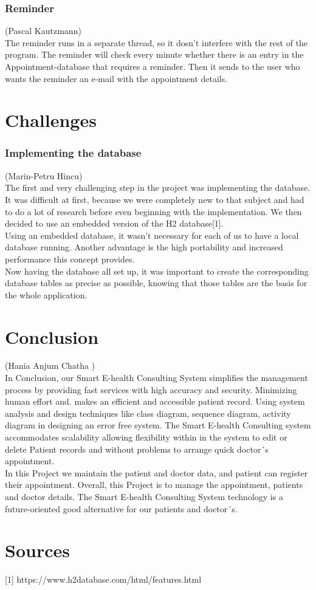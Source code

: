 \documentclass[a4paper, 12pt]{report}
\begin{document}
\subsection{Reminder}
{\tiny (Pascal Kautzmann)\\}
The reminder runs in a separate thread, so it dosn't interfere with the rest of the program.
The reminder will check every minute whether there is an entry in the Appointment-database that requires a reminder. 
Then it sends to the user who wants the reminder an e-mail with the appointment details.


\chapter{Challenges}
\subsection{Implementing the database}
{\tiny (Marin-Petru Hincu)\\}
The first and very challenging step in the project was implementing the database. It was difficult at first, because we were completely new to that subject and had to do a lot of research before even beginning with the implementation. We then decided to use an embedded version of the H2 database[1].\\
Using an embedded database, it wasn't necessary for each of us to have a local database running. Another advantage is the high portability and increased performance this concept provides.\\
Now having the database all set up, it was important to create the corresponding database tables as precise as possible, knowing that those tables are the basis for the whole application. \\

\chapter{Conclusion}
{\tiny (Hania Anjum Chatha )\\}
In Conclusion, our Smart E-health Consulting System simplifies the management process by providing fast services with high accuracy and security. Minimizing human effort and. makes an efficient and accessible patient record. Using system analysis and design techniques like class diagram, sequence diagram, activity diagram in designing an error free system. The Smart E-health Consulting system accommodates scalability allowing flexibility within in the system to edit or delete Patient records and without problems to arrange quick doctor´s appointment. \\
In this Project we maintain the patient and doctor data, and patient can register their appointment. Overall, this Project is to manage the appointment, patients and doctor details. The Smart E-health Consulting System technology is a future-oriented good alternative for our patients and doctor´s.

\chapter{Sources}
[1] https://www.h2database.com/html/features.html
\end{document}
